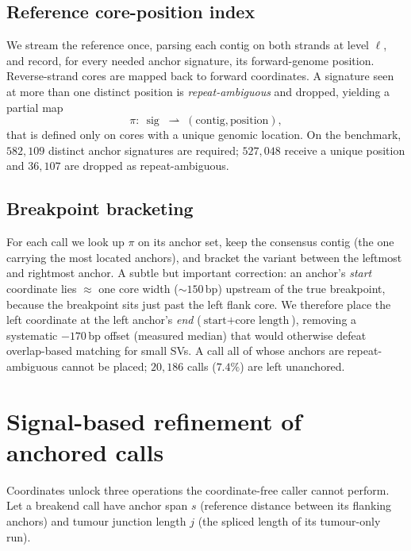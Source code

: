 \documentclass[11pt]{article}
\newcommand{\sig}{\operatorname{sig}}
\begin{document}
\subsection{Reference core-position index}
We stream the reference once, parsing each contig on both strands at level $\ell$, and record, for
every needed anchor signature, its forward-genome position. Reverse-strand cores are mapped back
to forward coordinates. A signature seen at more than one distinct position is
\emph{repeat-ambiguous} and dropped, yielding a partial map
\begin{equation}
\pi:\ \sig \;\rightharpoonup\; (\text{contig}, \text{position}),
\end{equation}
that is defined only on cores with a unique genomic location. On the benchmark, $582{,}109$
distinct anchor signatures are required; $527{,}048$ receive a unique position and $36{,}107$ are
dropped as repeat-ambiguous.

\subsection{Breakpoint bracketing}
For each call we look up $\pi$ on its anchor set, keep the consensus contig (the one carrying the
most located anchors), and bracket the variant between the leftmost and rightmost anchor. A subtle
but important correction: an anchor's \emph{start} coordinate lies $\approx$ one core width
($\sim\!150$\,bp) upstream of the true breakpoint, because the breakpoint sits just past the left
flank core. We therefore place the left coordinate at the left anchor's \emph{end}
($\text{start} + \text{core length}$), removing a systematic $-170$\,bp offset (measured median)
that would otherwise defeat overlap-based matching for small SVs. A call all of whose anchors are
repeat-ambiguous cannot be placed; $20{,}186$ calls ($7.4\%$) are left unanchored.

\section{Signal-based refinement of anchored calls}
\label{sec:refine}

Coordinates unlock three operations the coordinate-free caller cannot perform. Let a breakend
call have anchor span $s$ (reference distance between its flanking anchors) and tumour junction
length $j$ (the spliced length of its tumour-only run).
\end{document}
